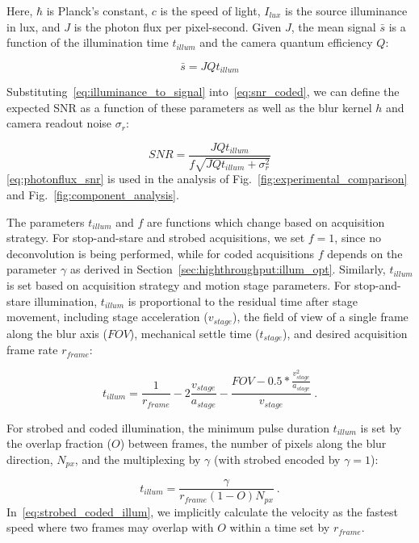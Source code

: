 Here, $\hbar$ is Planck's constant, $c$ is the speed of light, $I_{lux}$ is the source illuminance in lux, and $J$ is the photon flux per pixel-second. Given $J$, the mean signal $\bar{s}$ is a function of the illumination time $t_{illum}$ and the camera quantum efficiency $Q$:

\begin{equation}
\label{eq:illuminance_to_signal}
    \bar{s} = J Q t_{illum}
\end{equation}

Substituting~\eqref{eq:illuminance_to_signal} into~\eqref{eq:snr_coded}, we can define the expected SNR as a function of these parameters as well as the blur kernel $h$ and camera readout noise $\sigma_r$:

\begin{equation}
\label{eq:photonflux_snr}
SNR = \frac{J Q t_{illum}}{f \sqrt{J Q t_{illum} + \sigma_r^2}}
\end{equation}
\eqref{eq:photonflux_snr} is used in the analysis of Fig.~\ref{fig:experimental_comparison} and Fig.~\ref{fig:component_analysis}.

The parameters $t_{illum}$ and $f$ are functions which change based on acquisition strategy.
For stop-and-stare and strobed acquisitions, we set $f = 1$, since no deconvolution is being performed, while for coded acquisitions $f$ depends on the parameter $\gamma$ as derived in Section~\ref{sec:highthroughput:illum_opt}.
Similarly, $t_{illum}$ is set based on acquisition strategy and motion stage parameters. For stop-and-stare illumination, $t_{illum}$ is proportional to the residual time after stage movement, including stage acceleration ($v_{stage}$), the field of view of a single frame along the blur axis ($FOV$), mechanical settle time ($t_{stage}$), and desired acquisition frame rate $r_{frame}$:

\begin{equation}
\label{eq:sns_illum}
t_{illum} = \frac{1}{r_{frame}} - 2\frac{v_{stage}}{a_{stage}} - \frac{FOV - 0.5 * \frac{v_{stage}^2}{a_{stage}}}{v_{stage}}\:.
\end{equation}

For strobed and coded illumination, the minimum pulse duration $t_{illum}$ is set by the overlap fraction ($O$) between frames, the number of pixels along the blur direction, $N_{px}$, and the multiplexing by $\gamma$ (with strobed encoded by $\gamma=1$):

\begin{equation}
\label{eq:strobed_coded_illum}
t_{illum} = \frac{\gamma}{r_{frame}(1 - O) N_{px}}\:.
\end{equation}
In~\eqref{eq:strobed_coded_illum}, we implicitly calculate the velocity as the fastest speed where two frames may overlap with $O$ within a time set by $r_{frame}$.

